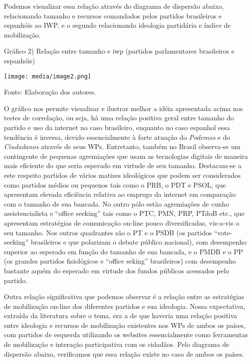 Podemos visualizar essa relação através do diagrama de dispersão abaixo,
relacionando tamanho e recursos comandados pelos partidos brasileiros e
espanhóis ao IWP, e o segundo relacionando ideologia partidária e índice
de mobilização.

Gráfico 2) Relação entre tamanho e iwp (partidos parlamentares
brasileiros e espanhóis)

\texttt{[image: media/image2.png]}

Fonte: Elaboração dos autores.

O gráfico nos permite visualizar e ilustrar melhor a idéia apresentada
acima nos testes de correlação, ou seja, há uma relação positiva geral
entre tamanho do partido e uso da internet no caso brasileiro, enquanto
no caso espanhol essa tendência é inversa, devido essencialmente à forte
atuação do \emph{Podemos} e do \emph{Ciudadanos} através de seus WPs.
Entretanto, também no Brasil observa-se um contingente de pequenas
agremiações que usam as tecnologias digitais de maneira mais eficiente
do que seria esperado em virtude de seu tamanho. Destacam-se a este
respeito partidos de vários matizes ideológicos que podem ser
considerados como partidos médios ou pequenos tais como o PRB, o PDT e
PSOL, que apresentam elevada eficiência relativa ao emprego da internet
em comparação com o tamanho de sua bancada. No outro pólo estão
agremiações de cunho assistencialista e ``office seeking'' tais como o
PTC, PMN, PRP, PTdoB etc., que apresentam estratégias de comunicação
on-line pouco diversificadas, vis-a-vis o seu tamanho. Nos outros
quadrantes são o PT e o PSDB (os partidos ``vote-seeking'' brasileiros e
que polarizam o debate público nacional), com desempenho superior ao
esperado em função do tamanho de sua bancada, e o PMDB e o PP (os
grandes partidos fisiológicos e ``office seking'' brasileiros) com
desempenho bastante aquém do esperado em virtude dos fundos públicos
acessados pelo partido.

Outra relação significativa que podemos observar é a relação entre as
estratégias de mobilização on-line dos diferentes partidos e sua
ideologia. Nossa expectativa, extraída da literatura sobre o tema, era a
de que haveria uma relação positiva entre ideologia e recursos de
mobilização existentes nos WPs de ambos os países, com partidos de
esquerda utilizando os websites essencialmente como ferramentas de
mobilização e interação participativa com os cidadãos. Pelo diagrama de
dispersão abaixo, verificamos que essa relação existe no caso de ambos
os países.

